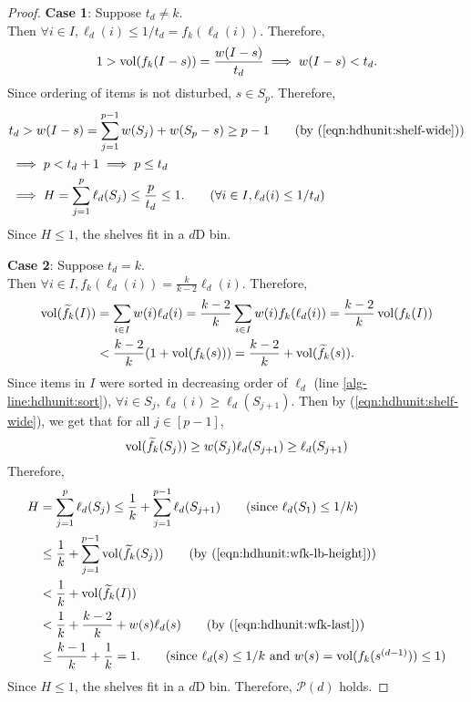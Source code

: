 \begin{proof}
\textbf{Case 1}: Suppose $t_d \neq k$.\\
Then $\forall i \in I, \ell_d(i) \le 1/t_d = f_k(\ell_d(i))$. Therefore,
\[ 1 > \operatorname{vol}(f_k(I-s)) = \frac{w(I-s)}{t_d} \implies w(I-s) < t_d. \]
Since ordering of items is not disturbed, $s \in S_p$. Therefore,
\begin{align*}
& t_d > w(I-s) = \sum_{j=1}^{p-1} w(S_j) + w(S_p - s) \ge p-1
\tag{by (\ref{eqn:hdhunit:shelf-wide})}
\\ &\implies p < t_d + 1 \implies p \le t_d
\\ &\implies H = \sum_{j=1}^p \ell_d(S_j) \le \frac{p}{t_d} \le 1.
\tag{$\forall i \in I, \ell_d(i) \le 1/t_d$}
\end{align*}
Since $H \le 1$, the shelves fit in a $d$D bin.

\textbf{Case 2}: Suppose $t_d = k$.\\
Then $\forall i \in I, f_k(\ell_d(i)) = \frac{k}{k-2}\ell_d(i)$. Therefore,
\begin{align}
\operatorname{vol}(\widetilde{f}_{k}(I)) &= \sum_{i \in I} w(i)\ell_d(i)
= \frac{k-2}{k} \sum_{i \in I} w(i)f_k(\ell_d(i))
= \frac{k-2}{k} \operatorname{vol}(f_k(I))
\nonumber
\\ \label{eqn:hdhunit:wfk-last}
&< \frac{k-2}{k} (1 + \operatorname{vol}(f_k(s)))
= \frac{k-2}{k} + \operatorname{vol}(\widetilde{f}_{k}(s)).
\end{align}
Since items in $I$ were sorted in decreasing order of $\ell_d$
(line \ref{alg-line:hdhunit:sort}),
$\forall i \in S_j, \ell_d(i) \ge \ell_d(S_{j+1})$.
Then by (\ref{eqn:hdhunit:shelf-wide}), we get that for all $j \in [p-1]$,
\begin{equation}
\label{eqn:hdhunit:wfk-lb-height}
\operatorname{vol}(\widetilde{f}_{k}(S_j)) \ge w(S_j)\ell_d(S_{j+1}) \ge \ell_d(S_{j+1})
\end{equation}
Therefore,
\begin{align*}
H &= \sum_{j=1}^{p} \ell_d(S_j)
\le \frac{1}{k} + \sum_{j=1}^{p-1} \ell_d(S_{j+1})
\tag{since $\ell_d(S_1) \le 1/k$}
\\ &\le \frac{1}{k} + \sum_{j=1}^{p-1} \vol(\wfk(S_j))
\tag{by (\ref{eqn:hdhunit:wfk-lb-height})}
\\ &< \frac{1}{k} + \vol(\wfk(I))
\\ &< \frac{1}{k} + \frac{k-2}{k} + w(s)\ell_d(s)
\tag{by (\ref{eqn:hdhunit:wfk-last})}
\\ &\le \frac{k-1}{k} + \frac{1}{k} = 1.
\tag{since $\ell_d(s) \le 1/k$ and $w(s) = \vol(f_k(s^{(d-1)})) \le 1$}
\end{align*}
Since $H \le 1$, the shelves fit in a $d$D bin.
Therefore, $\mathcal{P}(d)$ holds.


\end{proof}
